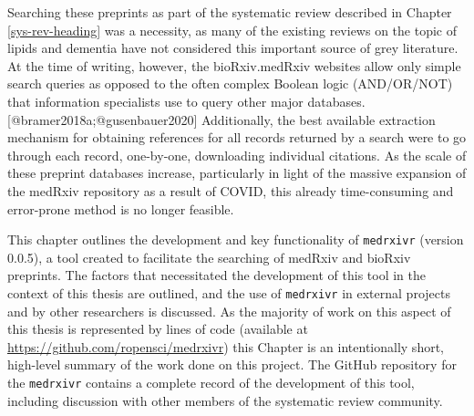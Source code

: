 \documentclass[a4paper, twoside]{templates/ociamthesis}
\begin{document}
Searching these preprints as part of the systematic review described in Chapter \ref{sys-rev-heading} was a necessity, as many of the existing reviews on the topic of lipids and dementia have not considered this important source of grey literature. At the time of writing, however, the bioRxiv.medRxiv websites allow only simple search queries as opposed to the often complex Boolean logic (AND/OR/NOT) that information specialists use to query other major databases.{[}@bramer2018a;@gusenbauer2020{]} Additionally, the best available extraction mechanism for obtaining references for all records returned by a search were to go through each record, one-by-one, downloading individual citations. As the scale of these preprint databases increase, particularly in light of the massive expansion of the medRxiv repository as a result of COVID, this already time-consuming and error-prone method is no longer feasible.

This chapter outlines the development and key functionality of \texttt{medrxivr} (version 0.0.5), a tool created to facilitate the searching of medRxiv and bioRxiv preprints. The factors that necessitated the development of this tool in the context of this thesis are outlined, and the use of \texttt{medrxivr} in external projects and by other researchers is discussed. As the majority of work on this aspect of this thesis is represented by lines of code (available at \url{https://github.com/ropensci/medrxivr}) this Chapter is an intentionally short, high-level summary of the work done on this project. The GitHub repository for the \texttt{medrxivr} contains a complete record of the development of this tool, including discussion with other members of the systematic review community.

~
\end{document}
